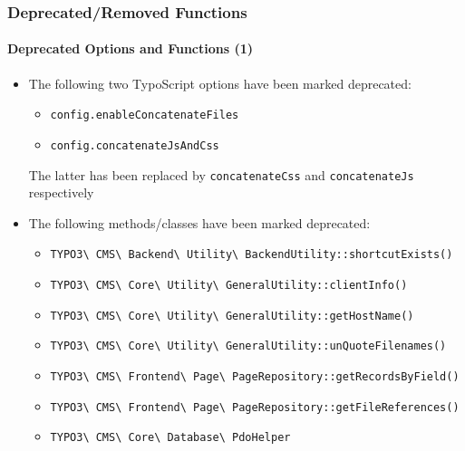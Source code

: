 \begin{frame}[fragile]
	\frametitle{Deprecated/Removed Functions}
	\framesubtitle{Deprecated Options and Functions (1)}

	\begin{itemize}
		\item The following two TypoScript options have been marked deprecated:

			\begin{itemize}\smaller
                \item \texttt{config.enableConcatenateFiles}
                \item \texttt{config.concatenateJsAndCss}
            \end{itemize}

        	\smaller
				The latter has been replaced by \texttt{concatenateCss} and
					\texttt{concatenateJs} respectively
			\normalsize

		\item The following methods/classes have been marked deprecated:

			\begin{itemize}\smaller
				\item \texttt{TYPO3\textbackslash
					CMS\textbackslash
					Backend\textbackslash
					Utility\textbackslash
					BackendUtility::shortcutExists()}

				\item \texttt{TYPO3\textbackslash
					CMS\textbackslash
					Core\textbackslash
					Utility\textbackslash
					GeneralUtility::clientInfo()}

				\item \texttt{TYPO3\textbackslash
					CMS\textbackslash
					Core\textbackslash
					Utility\textbackslash
					GeneralUtility::getHostName()}

				\item \texttt{TYPO3\textbackslash
					CMS\textbackslash
					Core\textbackslash
					Utility\textbackslash
					GeneralUtility::unQuoteFilenames()}

				\item \texttt{TYPO3\textbackslash
					CMS\textbackslash
					Frontend\textbackslash
					Page\textbackslash
					PageRepository::getRecordsByField()}

				\item \texttt{TYPO3\textbackslash
					CMS\textbackslash
					Frontend\textbackslash
					Page\textbackslash
					PageRepository::getFileReferences()}

				\item \texttt{TYPO3\textbackslash
					CMS\textbackslash
					Core\textbackslash
					Database\textbackslash
					PdoHelper}

			\end{itemize}
	\end{itemize}

\end{frame}

